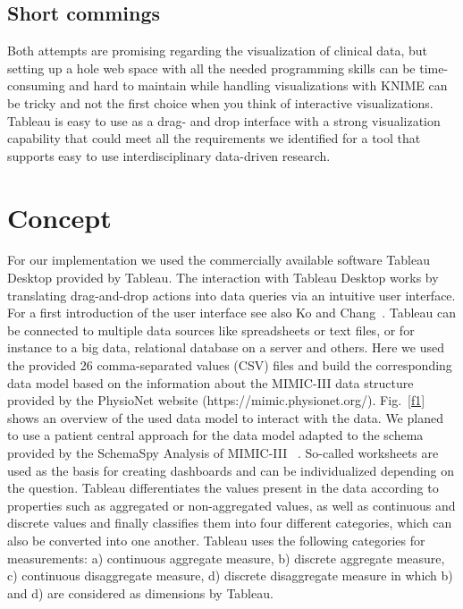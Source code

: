 \documentclass[aac,crcready]{iosart2x}
\begin{document}
\subsection{Short commings}
Both attempts are promising regarding the visualization of clinical data, but setting up a hole web space with all the needed programming skills can be time-consuming and hard to maintain while handling visualizations with KNIME can be tricky and not the first choice when you think of interactive visualizations. Tableau is easy to use as a drag- and drop interface with a strong visualization capability that could meet all the requirements we identified for a tool that supports easy to use interdisciplinary data-driven research.
 
\section{Concept}\label{s3}
%
For our implementation we used the commercially available software Tableau Desktop provided by Tableau\textregistered. The interaction with Tableau Desktop works by translating drag-and-drop actions into data queries via an intuitive user interface. For a first introduction of the user interface see also Ko and Chang~\cite{Ko.2017}. 
Tableau can be connected to multiple data sources like spreadsheets or text files, or for instance to a big data, relational database on a server and others. Here we used the provided 26 comma-separated values (CSV) files and build the corresponding data model based on the information about the MIMIC-III data structure provided by the PhysioNet website (https://mimic.physionet.org/). Fig.~\ref{f1} shows an overview of the used data model to interact with the data. We planed to use a patient central approach for the data model adapted to the schema provided by the SchemaSpy Analysis of MIMIC-III ~\cite{SchemaSpy.2017}. So-called worksheets are used as the basis for creating dashboards and can be individualized depending on the question.
Tableau differentiates the values present in the data according to properties such as aggregated or non-aggregated values, as well as continuous and discrete values and finally classifies them into four different categories, which can also be converted into one another. Tableau uses the following categories for measurements: a) continuous aggregate measure, b) discrete aggregate measure, c) continuous disaggregate measure, d) discrete disaggregate measure in which b) and d) are considered as dimensions by Tableau.
\end{document}
